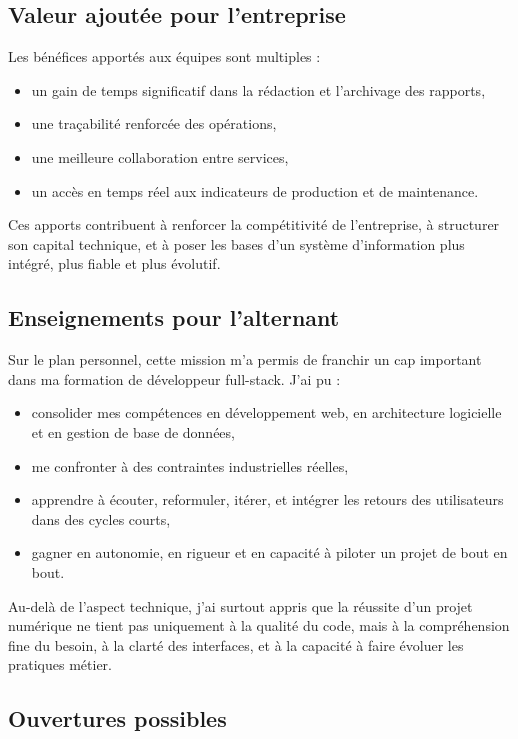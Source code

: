 \documentclass[11pt,a4paper]{article}
\begin{document}
\subsection*{Valeur ajoutée pour l’entreprise}

Les bénéfices apportés aux équipes sont multiples :
\begin{itemize}
    \item un gain de temps significatif dans la rédaction et l’archivage des rapports,
    \item une traçabilité renforcée des opérations,
    \item une meilleure collaboration entre services,
    \item un accès en temps réel aux indicateurs de production et de maintenance.
\end{itemize}

Ces apports contribuent à renforcer la compétitivité de l’entreprise, à structurer son capital technique, et à poser les bases d’un système d’information plus intégré, plus fiable et plus évolutif.

\subsection*{Enseignements pour l’alternant}

Sur le plan personnel, cette mission m’a permis de franchir un cap important dans ma formation de développeur full-stack. J’ai pu :
\begin{itemize}
    \item consolider mes compétences en développement web, en architecture logicielle et en gestion de base de données,
    \item me confronter à des contraintes industrielles réelles,
    \item apprendre à écouter, reformuler, itérer, et intégrer les retours des utilisateurs dans des cycles courts,
    \item gagner en autonomie, en rigueur et en capacité à piloter un projet de bout en bout.
\end{itemize}

Au-delà de l’aspect technique, j’ai surtout appris que la réussite d’un projet numérique ne tient pas uniquement à la qualité du code, mais à la compréhension fine du besoin, à la clarté des interfaces, et à la capacité à faire évoluer les pratiques métier.

\subsection*{Ouvertures possibles}
\end{document}
